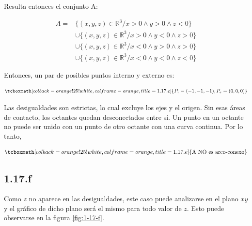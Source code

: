 \documentclass{article}
\renewcommand{\Bbb}{\mathbb}
\begin{document}
Resulta entonces el conjunto A:

\begin{equation}
\begin{array}{ll}
A = & \{ (x,y,z) \in \Bbb R^3 / x > 0 \wedge y > 0 \wedge z < 0 \} \\
& \cup \{ (x,y,z) \in \Bbb R^3 / x > 0 \wedge y < 0 \wedge z > 0 \} \\
& \cup \{ (x,y,z) \in \Bbb R^3 / x < 0 \wedge y > 0 \wedge z > 0 \} \\
& \cup \{ (x,y,z) \in \Bbb R^3 / x < 0 \wedge y < 0 \wedge z < 0 \}
\end{array}
\end{equation}

Entonces, un par de posibles puntos interno y externo es:

\begin{equation}
\tcboxmath[colback=orange!25!white,colframe=orange,title=1.17.e]
{
P_i = (-1, -1, -1), P_e = (0, 0, 0)
}
\end{equation}

Las desigualdades son estrictas, lo cual excluye los ejes y el origen. Sin esas áreas de contacto, los octantes quedan desconectados entre sí. Un punto en un octante no puede ser unido con un punto de otro octante con una curva continua. Por lo tanto,

\begin{equation}
\tcboxmath[colback=orange!25!white,colframe=orange,title=1.17.e]
{ \text{A NO es arco-conexo} }
\end{equation}

\subsection*{1.17.f}
\label{subsec:1.17.f}

Como $z$ no aparece en las desigualdades, este caso puede analizarse en el plano $xy$ y el gráfico de dicho plano será el mismo para todo valor de $z$. Esto puede observarse en la figura \ref{fig:1-17-f}.
\end{document}
